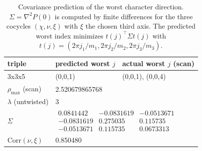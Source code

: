\begin{table}[H]
\centering
\scriptsize
\setlength{\tabcolsep}{6pt}
\caption{Covariance prediction of the worst character direction. $\Sigma=\nabla^2 P(0)$ is computed by finite differences for the three cocycles $(\chi,\nu,\xi)$ with $\xi$ the chosen third axis. The predicted worst index minimizes $t(j)^\top\Sigma t(j)$ with $t(j)=(2\pi j_1/m_1,2\pi j_2/m_2,2\pi j_3/m_3)$.}
\label{tab:real_input_40_covariance_worst_character}
\begin{tabular}{l l l}
\toprule
triple & predicted worst $j$ & actual worst $j$ (scan)\\
\midrule
3x3x5 & (0,0,1) & (0,0,1), (0,0,4)\\
\midrule
$\rho_{\max}$ (scan) & \multicolumn{2}{l}{2.520679865768}\\
$\lambda$ (untwisted) & \multicolumn{2}{l}{3}\\
\midrule
$\Sigma$ & \multicolumn{2}{l}{$\begin{smallmatrix}0.0841442&-0.0831619&-0.0513671\\-0.0831619&0.275035&0.115735\\-0.0513671&0.115735&0.0673313\end{smallmatrix}$}\\
$\mathrm{Corr}(\nu,\xi)$ & \multicolumn{2}{l}{0.850480}\\
\bottomrule
\end{tabular}
\end{table}
